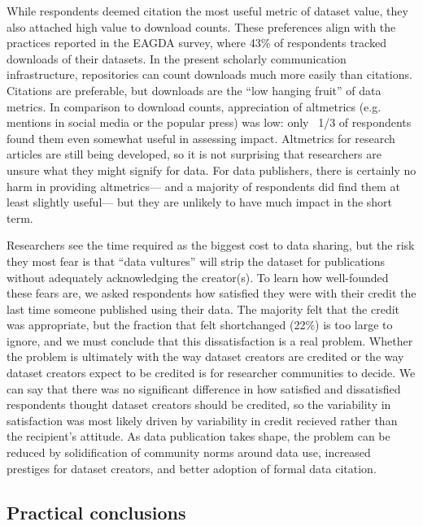 \documentclass[10pt]{article}
\begin{document}
While respondents deemed citation the most useful metric of dataset value, they also attached high value to download counts.
These preferences align with the practices reported in the EAGDA survey, where 43\% of respondents tracked downloads of their datasets\cite{bobrow_establishing_2014}.
In the present scholarly communication infrastructure, repositories can count downloads much more easily than citations.
Citations are preferable, but downloads are the ``low hanging fruit'' of data metrics.
In comparison to download counts, appreciation of altmetrics (e.g. mentions in social media or the popular press) was low: only ~1/3 of respondents found them even somewhat useful in assessing impact.
Altmetrics for research articles are still being developed, so it is not surprising that researchers are unsure what they might signify for data.
For data publishers, there is certainly no harm in providing altmetrics--- and a majority of respondents did find them at least slightly useful--- but they are unlikely to have much impact in the short term.

Researchers see the time required as the biggest cost to data sharing, but the risk they most fear is that ``data vultures'' will strip the dataset for publications without adequately acknowledging the creator(s)\cite{kim_institutional_2012}.
To learn how well-founded these fears are, we asked respondents how satisfied they were with their credit the last time someone published using their data.
The majority felt that the credit was appropriate, but the fraction that felt shortchanged (22\%) is too large to ignore, and we must conclude that this dissatisfaction is a real problem.
Whether the problem is ultimately with the way dataset creators are credited or the way dataset creators expect to be credited is for researcher communities to decide.
We can say that there was no significant difference in how satisfied and dissatisfied respondents thought dataset creators should be credited, so the variability in satisfaction was most likely driven by variability in credit recieved rather than the recipient's attitude.
As data publication takes shape, the problem can be reduced by solidification of community norms around data use, increased prestiges for dataset creators, and better adoption of formal data citation.

\subsection*{Practical conclusions}
\end{document}
